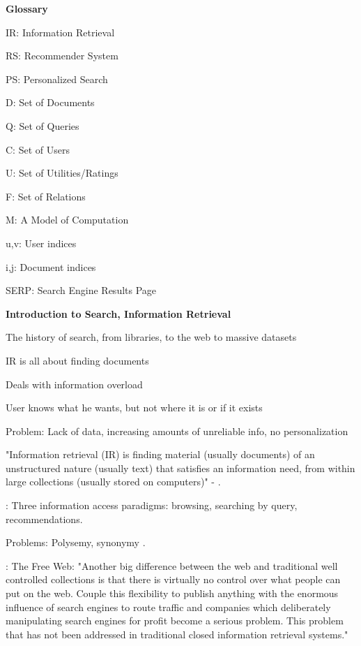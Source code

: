 \textbf{Glossary}

\begin{itemize*}
  \item IR: Information Retrieval 
  \item RS: Recommender System
  \item PS: Personalized Search
  \item D:  Set of Documents
  \item Q:  Set of Queries  
  \item C:  Set of Users
  \item U:  Set of Utilities/Ratings
  \item F:  Set of Relations
  \item M:  A Model of Computation
  \item u,v: User indices
  \item i,j: Document indices
  \item SERP: Search Engine Results Page
\end{itemize*}

\textbf{Introduction to Search, Information Retrieval}

\begin{itemize*}
  \item The history of search, from libraries, to the web to massive datasets
  \item IR is all about finding documents
  \item Deals with information overload \cite{Bjorkoy2010d}
  \item User knows what he wants, but not where it is or if it exists
  \item Problem: Lack of data, increasing amounts of unreliable info, no personalization
\end{itemize*}

"Information retrieval (IR) is finding material (usually documents)
of an unstructured nature (usually text) that satisfies an
information need, from within large collections 
(usually stored on computers)" - \cite[p1]{Manning2008}.

\cite[p2]{Micarelli2007}: Three information access paradigms: browsing, searching by query, recommendations.

Problems: Polysemy, synonymy \cite[p4]{Micarelli2007}.

\cite[p6]{Bender2005}: The Free Web:
"Another big difference between the web and traditional well controlled collections is that there is virtually no control over what people can put on the web. Couple this flexibility to publish anything with the enormous influence of search engines to route traffic and companies which deliberately manipulating search engines for profit become a serious problem. This problem that has not been addressed in traditional closed information retrieval systems."

